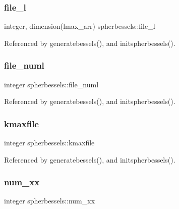 \subsubsection{\texorpdfstring{file\+\_\+l}{file\_l}}
{\footnotesize\ttfamily integer, dimension(lmax\+\_\+arr) spherbessels\+::file\+\_\+l\hspace{0.3cm}{\ttfamily [private]}}



Referenced by generatebessels(), and initspherbessels().

\mbox{\label{namespacespherbessels_ab9b99f417336f962381e26fc7611affa}} 
\subsubsection{\texorpdfstring{file\+\_\+numl}{file\_numl}}
{\footnotesize\ttfamily integer spherbessels\+::file\+\_\+numl\hspace{0.3cm}{\ttfamily [private]}}



Referenced by generatebessels(), and initspherbessels().

\mbox{\label{namespacespherbessels_acaac392a6ea328fe36eff8c422ff06ea}} 
\subsubsection{\texorpdfstring{kmaxfile}{kmaxfile}}
{\footnotesize\ttfamily integer spherbessels\+::kmaxfile\hspace{0.3cm}{\ttfamily [private]}}



Referenced by generatebessels(), and initspherbessels().

\mbox{\label{namespacespherbessels_af8cc74b859928826e087b37b4c365afa}} 
\subsubsection{\texorpdfstring{num\+\_\+xx}{num\_xx}}
{\footnotesize\ttfamily integer spherbessels\+::num\+\_\+xx\hspace{0.3cm}{\ttfamily [private]}}



